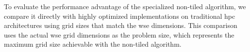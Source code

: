 




To evaluate the performance advantage of the specialized non-tiled algorithm, we compare it directly with highly optimized implementations on traditional \ac{hpc} architectures using grid sizes that match the \ac{wse} dimensions. This comparison uses the actual \ac{wse} grid dimensions as the problem size, which represents the maximum grid size achievable with the non-tiled algorithm.


